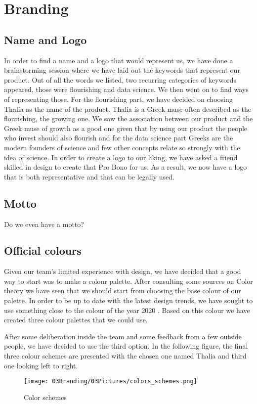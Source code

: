 \documentclass[main.tex]{subfiles}
\begin{document}
\section{Branding}

\subsection{Name and Logo}
In order to find a name and a logo that would represent us, we have done a brainstorming session where we have laid out the keywords that represent our product. Out of all the words we listed, two recurring categories of keywords appeared, those were flourishing and data science. We then went on to find ways of representing those. For the flourishing part, we have decided on choosing Thalia as the name of the product. Thalia is a Greek muse often described as the flourishing, the growing one. We saw the association between our product and the Greek muse of growth as a good one given that by using our product the people who invest should also flourish and for the data science part  Greeks are the modern founders of science and few other concepts relate so strongly with the idea of science. \newline\newline
In order to create a logo to our liking, we have asked a friend skilled in design to create that Pro Bono for us. As a result, we now have a logo that is both representative and that can be legally used.

\subsection{Motto}
Do we even have a motto? 


\subsection{Official colours} 
Given our team's limited experience with design, we have decided that a good way to start was to make a colour palette. After consulting some sources on Color theory \cite{how_to_color_palette} we have seen that we should start from choosing the base colour of our palette. In order to be up to date with the latest design trends, we have sought to use something close to the colour of the year 2020 \cite{pantone}. Based on this colour we have created three colour palettes that we could use.

After some deliberation inside the team and some feedback from a few outside people, we have decided to use the third option.      
In the following figure, the final three colour schemes are presented with the chosen one named Thalia and third one looking left to right.

\begin{figure}[H]
    \caption{Color schemes \cite{TR}}
    \texttt{[image: 03Branding/03Pictures/colors\_schemes.png]}
\end{figure}
\end{document}
